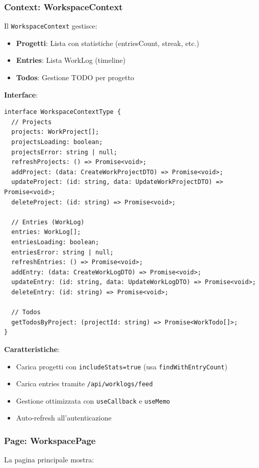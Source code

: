 \documentclass[11pt,a4paper]{article}
\begin{document}
\subsubsection{Context: WorkspaceContext}

Il \texttt{WorkspaceContext} gestisce:
\begin{itemize}
    \item \textbf{Progetti}: Lista con statistiche (entriesCount, streak, etc.)
    \item \textbf{Entries}: Lista WorkLog (timeline)
    \item \textbf{Todos}: Gestione TODO per progetto
\end{itemize}

\textbf{Interface}:
\begin{lstlisting}
interface WorkspaceContextType {
  // Projects
  projects: WorkProject[];
  projectsLoading: boolean;
  projectsError: string | null;
  refreshProjects: () => Promise<void>;
  addProject: (data: CreateWorkProjectDTO) => Promise<void>;
  updateProject: (id: string, data: UpdateWorkProjectDTO) => Promise<void>;
  deleteProject: (id: string) => Promise<void>;
  
  // Entries (WorkLog)
  entries: WorkLog[];
  entriesLoading: boolean;
  entriesError: string | null;
  refreshEntries: () => Promise<void>;
  addEntry: (data: CreateWorkLogDTO) => Promise<void>;
  updateEntry: (id: string, data: UpdateWorkLogDTO) => Promise<void>;
  deleteEntry: (id: string) => Promise<void>;
  
  // Todos
  getTodosByProject: (projectId: string) => Promise<WorkTodo[]>;
}
\end{lstlisting}

\textbf{Caratteristiche}:
\begin{itemize}
    \item Carica progetti con \texttt{includeStats=true} (usa \texttt{findWithEntryCount})
    \item Carica entries tramite \texttt{/api/worklogs/feed}
    \item Gestione ottimizzata con \texttt{useCallback} e \texttt{useMemo}
    \item Auto-refresh all'autenticazione
\end{itemize}

\subsubsection{Page: WorkspacePage}

La pagina principale mostra:
\end{document}
